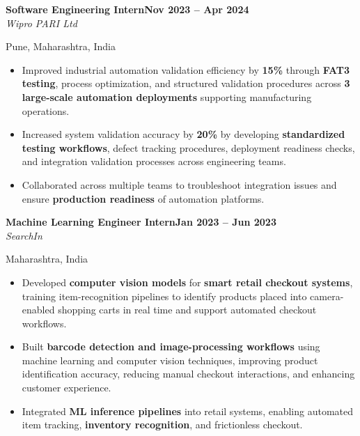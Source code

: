 \documentclass[letterpaper,8pt]{extarticle}
\newcommand{\entryline}[3]{%
  \noindent\textbf{#1}\hfill\textbf{#2} \\
  \noindent\textit{#3}%
}
\begin{document}
\vspace{0pt}

\entryline
{Software Engineering Intern}
{Nov 2023 -- Apr 2024}
{Wipro PARI Ltd}
{Pune, Maharashtra, India}
\vspace{0pt}
\begin{itemize}
    \item Improved industrial automation validation efficiency by \textbf{15\%} through \textbf{FAT3 testing}, process optimization, and structured validation procedures across \textbf{3 large-scale automation deployments} supporting manufacturing operations.

    \item Increased system validation accuracy by \textbf{20\%} by developing \textbf{standardized testing workflows}, defect tracking procedures, deployment readiness checks, and integration validation processes across engineering teams.

    \item Collaborated across multiple teams to troubleshoot integration issues and ensure \textbf{production readiness} of automation platforms.
\end{itemize}

\vspace{0pt}

\entryline
{Machine Learning Engineer Intern}
{Jan 2023 -- Jun 2023}
{SearchIn}
{Maharashtra, India}
\vspace{0pt}
\begin{itemize}
    \item Developed \textbf{computer vision models} for \textbf{smart retail checkout systems}, training item-recognition pipelines to identify products placed into camera-enabled shopping carts in real time and support automated checkout workflows.

    \item Built \textbf{barcode detection and image-processing workflows} using machine learning and computer vision techniques, improving product identification accuracy, reducing manual checkout interactions, and enhancing customer experience.

    \item Integrated \textbf{ML inference pipelines} into retail systems, enabling automated item tracking, \textbf{inventory recognition}, and frictionless checkout.
\end{itemize}

\vspace{0pt}
\end{document}
